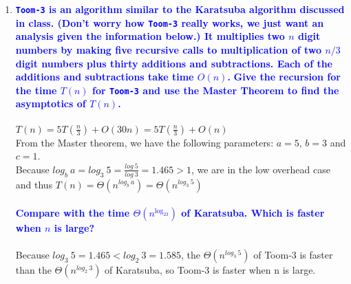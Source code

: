 \documentclass[11pt]{article}
\begin{document}
\begin{enumerate}
\item  \textbf{\textcolor{blue}{{\tt Toom-3} is an algorithm similar to the 
Karatsuba algorithm discussed in class.  (Don't worry how
{\tt Toom-3} really works, we just want an analysis given the
information below.)
It multiplies two $n$ digit numbers by making five recursive calls
to multiplication of two $n/3$ digit numbers plus thirty additions
and subtractions.  Each of the additions and subtractions take
time $O(n)$.}}
    \newline
    \textbf{\textcolor{blue}{Give the recursion for the time $T(n)$ for {\tt Toom-3} and
    use the Master Theorem to find the asymptotics of $T(n)$.}}
        \\\\ $T(n) = 5T(\frac{n}{3}) + O(30n) = 5T(\frac{n}{3}) + O(n)$
        \\ From the Master theorem, we have the following parameters: $a = 5$, $b = 3$ and $c = 1$.
        \\ Because $log_b\ a = log_3\ 5 = \frac{log\ 5}{log\ 3} = 1.465 > 1$, we are in the low overhead case and thus $T(n) = \Theta(n^{log_b\ a}) = \Theta(n^{log_3\ 5})$ \\\\
    \textbf{\textcolor{blue}{Compare with the time $\Theta(n^{\log_23})$ of Karatsuba.  Which is faster when $n$
    is large?}}
        \\\\ Because $log_3\ 5 = 1.465 < log_2\ 3 = 1.585$, the $\Theta(n^{log_3\ 5})$ of Toom-3 is faster than the $\Theta(n^{log_2\ 3})$ of Karatsuba, so Toom-3 is faster when n is large. \\


\end{enumerate}
\end{document}
